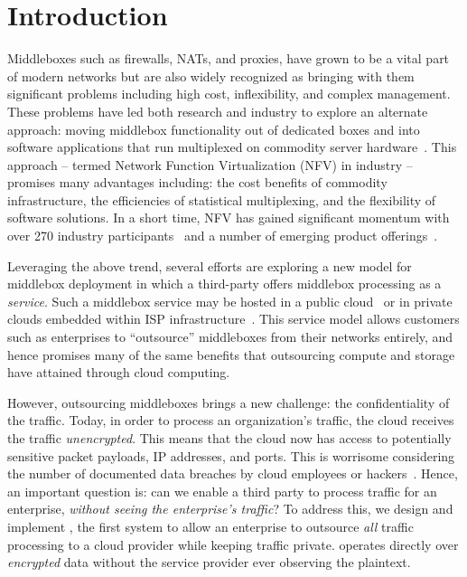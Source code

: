 \section{Introduction}\label{sec:intro}

Middleboxes such as firewalls, NATs, and proxies, have grown to be a vital part of modern networks but are 
also widely recognized as bringing  with them significant problems including high cost, inflexibility, and complex management.  
These problems have led both research and industry to explore an alternate approach: moving middlebox functionality out of dedicated boxes and into 
software applications that run multiplexed on commodity server hardware~\cite{mb-manifesto,comb,aplomb,opennf,clickos,flowtags,nfv,domain20,opnfv}.
This approach -- termed Network Function Virtualization (NFV) in industry -- promises many advantages including: the cost benefits of commodity infrastructure, 
the efficiencies of statistical multiplexing, and the flexibility of software solutions. 
In a short time, NFV has gained significant momentum with over 270 industry participants~\cite{etsi-nfv} and a number of emerging product offerings~\cite{something}.

Leveraging the above trend, several efforts are exploring a new model for middlebox deployment in which a third-party offers middlebox processing as a  
\emph{service}.
Such a middlebox service may be hosted in a public cloud~\cite{aplomb,zscalar,aryaka} or in private clouds embedded within ISP 
infrastructure~\cite{domain20, telefonica, find-more}.  
This service model allows customers such as enterprises to ``outsource'' middleboxes from their networks entirely, and hence promises many of the same 
benefits that outsourcing compute and storage have attained through cloud computing.%

However, outsourcing middleboxes brings a new challenge: the confidentiality of the traffic. 
Today, in order to process an organization's traffic, the cloud receives the traffic {\em unencrypted}.  This means that the cloud 
now has access to potentially sensitive packet payloads,  IP addresses, and ports. This is 
worrisome considering the number of documented data breaches by cloud employees or hackers~\cite{PrivacyRecords}.
Hence, an important question is: can we enable a third party to process traffic for an enterprise, {\em without seeing the enterprise's traffic}?
To address this, we design and implement \sys, the first system to allow an enterprise to outsource {\it all} traffic processing to a cloud provider while keeping traffic private. 
\sys operates directly over {\it encrypted} data without the service provider ever observing the plaintext.


